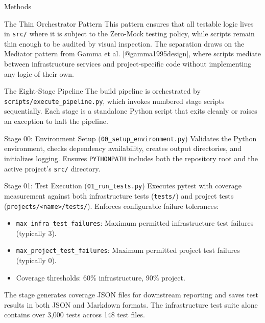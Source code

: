 \documentclass[
  ignorenonframetext,
]{beamer}
\providecommand{\tightlist}{%
  \setlength{\itemsep}{0pt}\setlength{\parskip}{0pt}}
\begin{document}
\begin{frame}[fragile]{Methods}
\begin{block}{The Thin Orchestrator Pattern}
This pattern ensures that all testable logic lives in \texttt{src/}
where it is subject to the Zero-Mock testing policy, while scripts
remain thin enough to be audited by visual inspection. The separation
draws on the Mediator pattern from Gamma et al. {[}@gamma1995design{]},
where scripts mediate between infrastructure services and
project-specific code without implementing any logic of their own.
\end{block}

\begin{block}{The Eight-Stage Pipeline}
\protect{}\label{the-eight-stage-pipeline}
The build pipeline is orchestrated by
\texttt{scripts/execute\_pipeline.py}, which invokes numbered stage
scripts sequentially. Each stage is a standalone Python script that
exits cleanly or raises an exception to halt the pipeline.

\begin{block}{Stage 00: Environment Setup
(\texttt{00\_setup\_environment.py})}
\protect{}\label{stage-00-environment-setup-00_setup_environment.py}
Validates the Python environment, checks dependency availability,
creates output directories, and initializes logging. Ensures
\texttt{PYTHONPATH} includes both the repository root and the active
project's \texttt{src/} directory.
\end{block}

\begin{block}{Stage 01: Test Execution (\texttt{01\_run\_tests.py})}
\protect{}\label{stage-01-test-execution-01_run_tests.py}
Executes pytest with coverage measurement against both infrastructure
tests (\texttt{tests/}) and project tests
(\texttt{projects/\textless{}name\textgreater{}/tests/}). Enforces
configurable failure tolerances:

\begin{itemize}
\tightlist
\item
  \texttt{max\_infra\_test\_failures}: Maximum permitted infrastructure
  test failures (typically 3).
\item
  \texttt{max\_project\_test\_failures}: Maximum permitted project test
  failures (typically 0).
\item
  Coverage thresholds: 60\% infrastructure, 90\% project.
\end{itemize}

The stage generates coverage JSON files for downstream reporting and
saves test results in both JSON and Markdown formats. The infrastructure
test suite alone contains over 3,000 tests across 148 test files.
\end{block}


\end{block}
\end{frame}
\end{document}
